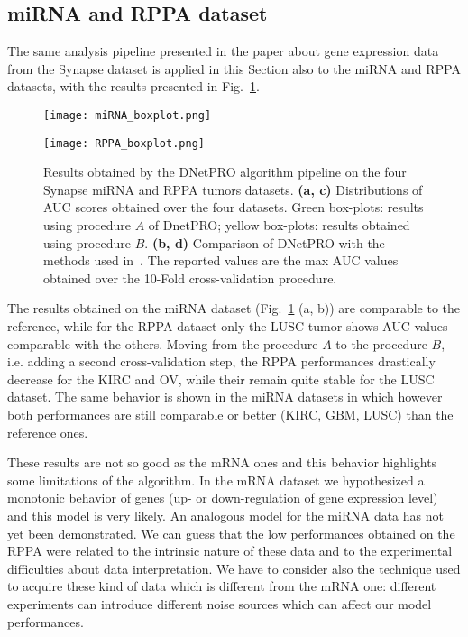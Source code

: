 \documentclass{standalone}
\begin{document}
\subsection[miRNA and RPPA data]{miRNA and RPPA dataset}\label{synapse:miRNA}

The same analysis pipeline presented in the paper about gene expression data from the Synapse dataset is applied in this Section also to the miRNA and RPPA datasets, with the results presented in Fig.~\ref{fig:other_results}.

\begin{figure}[htbp]
\centering
\texttt{[image: miRNA\_boxplot.png]}
\qquad
\def\svgwidth{0.45\textwidth}

\newline
\texttt{[image: RPPA\_boxplot.png]}
\qquad
\centering
\def\svgwidth{0.45\textwidth}

\caption{Results obtained by the DNetPRO algorithm pipeline on the four Synapse miRNA and RPPA tumors datasets.
\textbf{(a, c)} Distributions of AUC scores obtained over the four datasets.
Green box-plots: results using procedure $A$ of DnetPRO; yellow box-plots: results obtained using procedure $B$.
\textbf{(b, d)} Comparison of DNetPRO with the methods used in~\cite{Yuan2014}.
The reported values are the max AUC values obtained over the 10-Fold cross-validation procedure.
}
\label{fig:other_results}
\end{figure}

The results obtained on the miRNA dataset (Fig.~\ref{fig:other_results} (a, b)) are comparable to the reference, while for the RPPA dataset only the LUSC tumor shows AUC values comparable with the others.
Moving from the procedure $A$ to the procedure $B$, i.e. adding a second cross-validation step, the RPPA performances drastically decrease for the KIRC and OV, while their remain quite stable for the LUSC dataset.
The same behavior is shown in the miRNA datasets in which however both performances are still comparable or better (KIRC, GBM, LUSC) than the reference ones.

These results are not so good as the mRNA ones and this behavior highlights some limitations of the algorithm.
In the mRNA dataset we hypothesized a monotonic behavior of genes (up- or down-regulation of gene expression level) and this model is very likely.
An analogous model for the miRNA data has not yet been demonstrated.
We can guess that the low performances obtained on the RPPA were related to the intrinsic nature of these data and to the experimental difficulties about data interpretation.
We have to consider also the technique used to acquire these kind of data which is different from the mRNA one: different experiments can introduce different noise sources which can affect our model performances.
\end{document}
